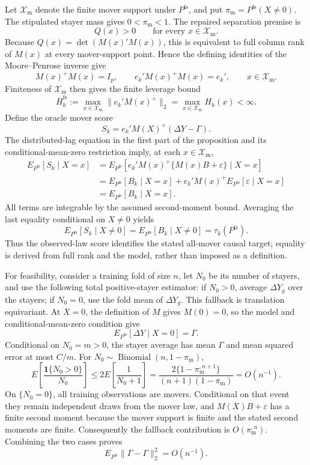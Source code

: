 Let \(\mathcal X_{\mathrm m}\) denote the finite mover support under \(P^{\mathrm{fs}}\), and put \(\pi_{\mathrm m}=P^{\mathrm{fs}}(X\ne0)\).  The stipulated stayer mass gives \(0<\pi_{\mathrm m}<1\).  The repaired separation premise is
\[
Q(x)>0\qquad\text{for every }x\in\mathcal X_{\mathrm m}.
\]
Because \(Q(x)=\det(M(x)'M(x))\), this is equivalent to full column rank of \(M(x)\) at every mover-support point.  Hence the defining identities of the Moore--Penrose inverse give
\[
M(x)^+M(x)=I_p,
\qquad
e_k'M(x)^+M(x)=e_k',
\qquad x\in\mathcal X_{\mathrm m}.
\]
Finiteness of \(\mathcal X_{\mathrm m}\) then gives the finite leverage bound
\[
\overline H_k^{\mathrm{fs}}
:=\max_{x\in\mathcal X_{\mathrm m}}\lVert e_k'M(x)^+\rVert_2
=\max_{x\in\mathcal X_{\mathrm m}}H_k(x)<\infty.
\]
Define the oracle mover score
\[
S_k=e_k'M(X)^+(\Delta Y-\Gamma).
\]
The distributed-lag equation in the first part of the proposition and its conditional-mean-zero restriction imply, at each \(x\in\mathcal X_{\mathrm m}\),
\[
\begin{aligned}
E_{P^{\mathrm{fs}}}[S_k\mid X=x]
&=E_{P^{\mathrm{fs}}}[e_k'M(x)^+\{M(x)B+\varepsilon\}\mid X=x]\\
&=E_{P^{\mathrm{fs}}}[B_k\mid X=x]
+e_k'M(x)^+E_{P^{\mathrm{fs}}}[\varepsilon\mid X=x]\\
&=E_{P^{\mathrm{fs}}}[B_k\mid X=x].
\end{aligned}
\]
All terms are integrable by the assumed second-moment bound.  Averaging the last equality conditional on \(X\ne0\) yields
\[
E_{P^{\mathrm{fs}}}[S_k\mid X\ne0]
=E_{P^{\mathrm{fs}}}[B_k\mid X\ne0]
=\tau_k(P^{\mathrm{fs}}).
\]
Thus the observed-law score identifies the stated all-mover causal target; equality is derived from full rank and the model, rather than imposed as a definition.

For feasibility, consider a training fold of size \(n\), let \(N_0\) be its number of stayers, and use the following total positive-stayer estimator: if \(N_0>0\), average \(\Delta Y_g\) over the stayers; if \(N_0=0\), use the fold mean of \(\Delta Y_g\).  This fallback is translation equivariant.  At \(X=0\), the definition of \(M\) gives \(M(0)=0\), so the model and conditional-mean-zero condition give
\[
E_{P^{\mathrm{fs}}}[\Delta Y\mid X=0]=\Gamma.
\]
Conditional on \(N_0=m>0\), the stayer average has mean \(\Gamma\) and mean squared error at most \(C/m\).  For \(N_0\sim\operatorname{Binomial}(n,1-\pi_{\mathrm m})\),
\[
E\!\left[\frac{\mathbf 1\{N_0>0\}}{N_0}\right]
\le 2E\!\left[\frac1{N_0+1}\right]
=\frac{2\{1-\pi_{\mathrm m}^{,n+1}\}}{(n+1)(1-\pi_{\mathrm m})}
=O(n^{-1}).
\]
On \(\{N_0=0\}\), all training observations are movers.  Conditional on that event they remain independent draws from the mover law, and \(M(X)B+\varepsilon\) has a finite second moment because the mover support is finite and the stated second moments are finite.  Consequently the fallback contribution is \(O(\pi_{\mathrm m}^{,n})\).  Combining the two cases proves
\[
E_{P^{\mathrm{fs}}}\lVert\widehat\Gamma-\Gamma\rVert_2^2=O(n^{-1}).
\]

